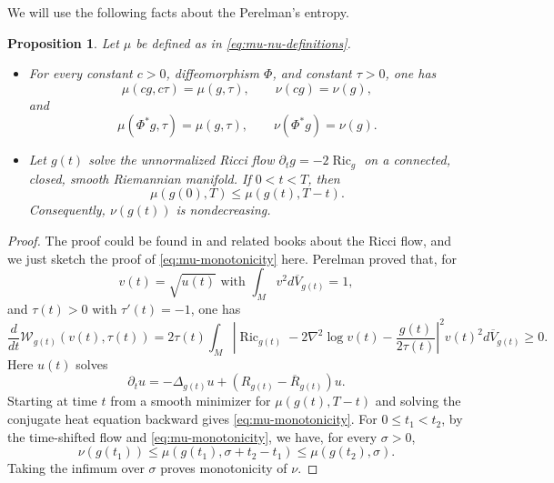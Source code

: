 \documentclass[11pt, reqno]{amsart}
\numberwithin{equation}{section}
\newtheorem{proposition}[theorem]{Proposition}
\theoremstyle{remark}
\DeclareMathOperator{\Ric}{Ric}
\newcommand{\dbarV}[1]{d\overline V_{#1}}
\begin{document}
We will use the following facts about the Perelman's entropy.
\begin{proposition}\label{prop:invariance}
Let $\mu$ be defined as in \eqref{eq:mu-nu-definitions}.
\begin{itemize}
    \item[(1)] For every constant $c>0$, diffeomorphism $\Phi$, and constant $\tau>0$, one has
\begin{equation}\label{eq:scaling-mu}
\mu(cg,c\tau)=\mu(g,\tau),
\qquad
\nu(cg)=\nu(g),
\end{equation}
and
\begin{equation}\label{eq:diffeo-mu}
\mu(\Phi^*g,\tau)=\mu(g,\tau),
\qquad
\nu(\Phi^*g)=\nu(g).
\end{equation}
\item[(2)] Let $g(t)$ solve the unnormalized Ricci flow
$\partial_tg=-2\Ric_g$ on a connected, closed, smooth Riemannian manifold. If $0<t<T$, then
\begin{equation}\label{eq:mu-monotonicity}
\mu(g(0),T)\leq\mu(g(t),T-t).
\end{equation}
Consequently, $\nu(g(t))$ is nondecreasing.
\end{itemize}

\end{proposition}
\begin{proof}
The proof could be found in \cite{Perelman} and related books about the Ricci flow, and we just sketch the proof of \eqref{eq:mu-monotonicity} here. Perelman \cite[Section~3, equations (3.1)-(3.4)]{Perelman} proved that, %
{for $$v(t)=\sqrt{u(t)} \text{ with }\int_Mv^2\dbarV {g(t)}=1,$$ and $\tau(t)>0$ with $\tau'(t)=-1$, one has
\begin{equation}\label{eq:Perelman-W-derivative}
\frac{d}{dt}\mathcal W_{g(t)}(v(t), \tau(t))=2\tau(t)\int_M\left|\Ric_{g(t)}-2\nabla^2\log v(t)-\frac{g(t)}{2\tau(t)}\right|^2v(t)^2\dbarV{g(t)}\geq0. 
\end{equation}
Here $u(t)$ solves
\begin{equation}
    \partial_tu=-\Delta_{g(t)}u+(R_{g(t)}-\overline{R}_{g(t)})u.
\end{equation}}Starting at time $t$ from a smooth minimizer for
$\mu(g(t),T-t)$ and solving the conjugate heat equation backward gives \eqref{eq:mu-monotonicity}. For $0\leq t_1<t_2$, by the time-shifted flow and \eqref{eq:mu-monotonicity}, we have, for every $\sigma>0$,
\[
\nu(g(t_1))\leq\mu(g(t_1),\sigma+t_2-t_1)
\leq\mu(g(t_2),\sigma).
\]
Taking the infimum over $\sigma$ proves monotonicity of $\nu$. 
\end{proof}
\end{document}
